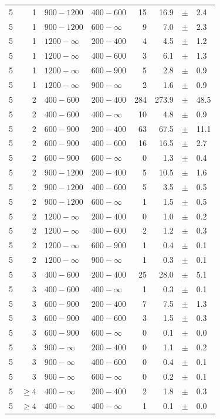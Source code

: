 \begin{table}[!h]
\begin{tabular}{rrllrrcl}
5 & 1 & $ 900-1200$ & $400-600$ &     15 &     16.9 &$\pm$&    2.4 \\
5 & 1 & $ 900-1200$ & $600-\infty$ &      9 &      7.0 &$\pm$&    2.3 \\
5\T & 1 & $1200- \infty$ & $200-400$ &      4 &      4.5 &$\pm$&    1.2 \\
5 & 1 & $1200- \infty$ & $400-600$ &      3 &      6.1 &$\pm$&    1.3 \\
5 & 1 & $1200- \infty$ & $600-900$ &      5 &      2.8 &$\pm$&    0.9 \\
5 & 1 & $1200- \infty$ & $900-\infty$ &      2 &      1.6 &$\pm$&    0.9 \\
5\T & 2 & $ 400- 600$ & $200-400$ &    284 &    273.9 &$\pm$&   48.5 \\
5 & 2 & $ 400- 600$ & $400-\infty$ &     10 &      4.8 &$\pm$&    0.9 \\
5\T & 2 & $ 600- 900$ & $200-400$ &     63 &     67.5 &$\pm$&   11.1 \\
5 & 2 & $ 600- 900$ & $400-600$ &     16 &     16.5 &$\pm$&    2.7 \\
5 & 2 & $ 600- 900$ & $600-\infty$ &      0 &      1.3 &$\pm$&    0.4 \\
5\T & 2 & $ 900-1200$ & $200-400$ &      5 &     10.5 &$\pm$&    1.6 \\
5 & 2 & $ 900-1200$ & $400-600$ &      5 &      3.5 &$\pm$&    0.5 \\
5 & 2 & $ 900-1200$ & $600-\infty$ &      1 &      1.5 &$\pm$&    0.5 \\
5\T & 2 & $1200- \infty$ & $200-400$ &      0 &      1.0 &$\pm$&    0.2 \\
5 & 2 & $1200- \infty$ & $400-600$ &      2 &      1.2 &$\pm$&    0.3 \\
5 & 2 & $1200- \infty$ & $600-900$ &      1 &      0.4 &$\pm$&    0.1 \\
5 & 2 & $1200- \infty$ & $900-\infty$ &      1 &      0.3 &$\pm$&    0.1 \\
5\T & 3 & $ 400- 600$ & $200-400$ &     25 &     28.0 &$\pm$&    5.1 \\
5 & 3 & $ 400- 600$ & $400-\infty$ &      1 &      0.3 &$\pm$&    0.1 \\
5\T & 3 & $ 600- 900$ & $200-400$ &      7 &      7.5 &$\pm$&    1.3 \\
5 & 3 & $ 600- 900$ & $400-600$ &      3 &      1.5 &$\pm$&    0.3 \\
5 & 3 & $ 600- 900$ & $600-\infty$ &      0 &      0.1 &$\pm$&    0.0 \\
5\T & 3 & $ 900- \infty$ & $200-400$ &      0 &      1.1 &$\pm$&    0.2 \\
5 & 3 & $ 900- \infty$ & $400-600$ &      0 &      0.4 &$\pm$&    0.1 \\
5 & 3 & $ 900- \infty$ & $600-\infty$ &      0 &      0.2 &$\pm$&    0.1 \\
5\T & $\geq 4$ & $ 400- \infty$ & $200-400$ &      2 &      1.8 &$\pm$&    0.3 \\
5 & $\geq 4$ & $ 400- \infty$ & $400-\infty$ &      1 &      0.1 &$\pm$&    0.0 \\
    \hline
  \end{tabular}
\end{table}

